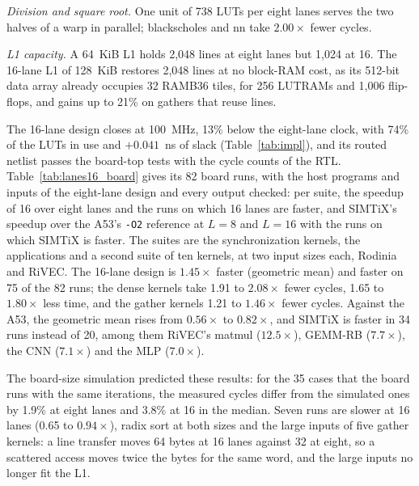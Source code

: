 \documentclass[journal]{IEEEtran}
\begin{document}
\emph{Division and square root.} One unit of 738 LUTs per eight lanes serves the two
halves of a warp in parallel; blackscholes and nn take $2.00\times$ fewer cycles.

\emph{L1 capacity.} A 64~KiB L1 holds 2,048 lines at eight lanes but 1,024 at 16. The
16-lane L1 of 128~KiB restores 2,048 lines at no block-RAM cost, as its 512-bit data
array already occupies 32 RAMB36 tiles, for 256 LUTRAMs and 1,006 flip-flops, and
gains up to 21\% on gathers that reuse lines.



The 16-lane design closes at 100~MHz, 13\% below the eight-lane clock, with 74\% of the
LUTs in use and $+0.041$~ns of slack (Table~\ref{tab:impl}), and its routed netlist
passes the board-top tests with the cycle counts of the RTL. Table~\ref{tab:lanes16_board}
gives its 82 board runs, with the host programs and inputs of the eight-lane design and
every output checked: per suite, the speedup of 16 over eight lanes and the runs on
which 16 lanes are faster, and SIMTiX's speedup over the A53's \texttt{-O2} reference
at $L=8$ and $L=16$ with the runs on which SIMTiX is faster. The suites are the
synchronization kernels, the applications and a second suite of ten kernels, at two
input sizes each, Rodinia and RiVEC. The 16-lane design is $1.45\times$ faster (geometric
mean) and faster on 75 of the 82 runs; the dense kernels take 1.91 to $2.08\times$ fewer
cycles, 1.65 to $1.80\times$ less time, and the gather kernels 1.21 to $1.46\times$
fewer cycles. Against the A53, the geometric mean rises from $0.56\times$ to
$0.82\times$, and SIMTiX is faster in 34 runs instead of 20, among them RiVEC's matmul
($12.5\times$), GEMM-RB ($7.7\times$), the CNN ($7.1\times$) and the MLP ($7.0\times$).

The board-size simulation predicted these results: for the 35 cases that the board runs
with the same iterations, the measured cycles differ from the simulated ones by 1.9\%
at eight lanes and 3.8\% at 16 in the median. Seven runs are slower at 16 lanes (0.65
to $0.94\times$), radix sort at both sizes and the large inputs of five gather kernels:
a line transfer moves 64 bytes at 16 lanes against 32 at eight, so a scattered access
moves twice the bytes for the same word, and the large inputs no longer fit the L1.
\end{document}
